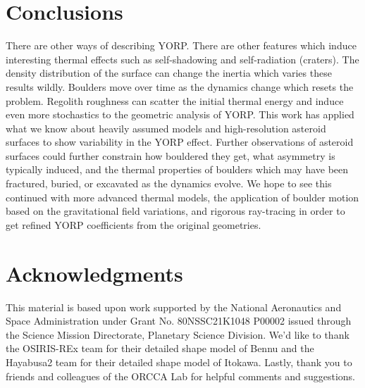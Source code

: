 \documentclass[12pt,notitlepage]{article}
\begin{document}
\section{Conclusions} \label{conclusion}
There are other ways of describing YORP. There are other features which induce interesting thermal effects such as self-shadowing and self-radiation (craters). The density distribution of the surface can change the inertia which varies these results wildly. Boulders move over time as the dynamics change which resets the problem. Regolith roughness can scatter the initial thermal energy and induce even more stochastics to the geometric analysis of YORP. This work has applied what we know about heavily assumed models and high-resolution asteroid surfaces to show variability in the YORP effect. Further observations of asteroid surfaces could further constrain how bouldered they get, what asymmetry is typically induced, and the thermal properties of boulders which may have been fractured, buried, or excavated as the dynamics evolve. We hope to see this continued with more advanced thermal models, the application of boulder motion based on the gravitational field variations, and rigorous ray-tracing in order to get refined YORP coefficients from the original geometries. 

\section*{Acknowledgments}

This material is based upon work supported by the National Aeronautics and Space Administration under Grant No. 80NSSC21K1048 P00002 issued through the Science Mission Directorate, Planetary Science Division. We'd like to thank the OSIRIS-REx team for their detailed shape model of Bennu and the Hayabusa2 team for their detailed shape model of Itokawa. Lastly, thank you to friends and colleagues of the ORCCA Lab for helpful comments and suggestions.

%
%
\newpage



\end{document}
